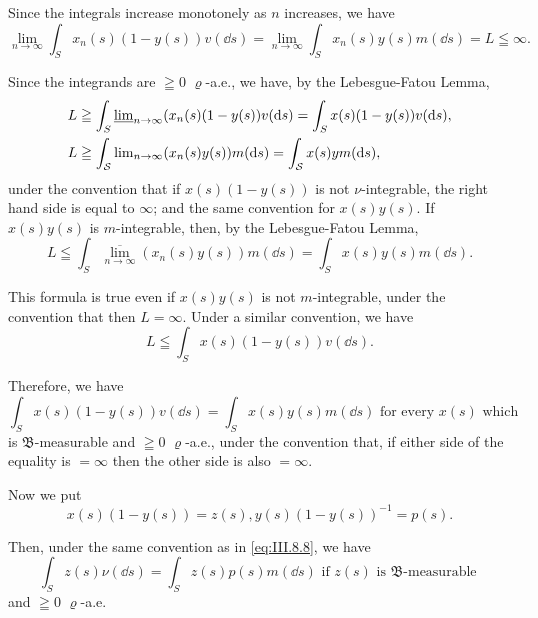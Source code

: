 Since the integrals increase monotonely as $n$ increases, we have 
\begin{equation}\label{eq:III.8.4}
\lim\limits _{n \rightarrow \infty} \int_{S} x _{n} (s) (1 - y (s)) v (\dd s) = \lim\limits _{n \rightarrow \infty} \int_{S} x _{n} (s) y (s) m (\dd s) = L \leqq \infty .
\end{equation}

Since the integrands are $\geqq 0$ $\varrho$-a.e., we have, by the Lebesgue-Fatou Lemma, 
\begin{align}
L& \geqq \int_{S} \varliminf\nolimits_{n \rightarrow \infty} (x _{n} (s) (1 - y (s)) v (\mathop{}\!\mathrm{d} s) = \int_{S} x (s) (1 - y (s)) v (\mathop{}\!\mathrm{d} s), \label{eq:III.8.5} \\
L& \geqq \int_ {\mathcal {S}} \lim\nolimits _{n \rightarrow \infty} (x _{n} (s) y (s)) m (\mathop{}\!\mathrm{d} s) = \int_ {\mathcal {S}} x (s) y m (\mathop{}\!\mathrm{d} s), \notag
\end{align}
under the convention that if $x(s) (1 - y(s))$ is not $\nu$-integrable, the right hand side is equal to $\infty$; and the same convention for $x(s) y(s)$. If $x(s) y(s)$ is $m$-integrable, then, by the Lebesgue-Fatou Lemma, 
\begin{equation}\label{eq:III.8.6}
L \leqq \int_{S} \overline {{\lim\limits _{n \rightarrow \infty}}} (x _{n} (s) y (s)) m (\dd s) = \int_{S} x (s) y (s) m (\dd s).
\end{equation}

This formula is true even if $x(s)y(s)$ is not $m$-integrable, under the convention that then $L=\infty$. Under a similar convention, we have 
\begin{equation}\label{eq:III.8.7}
L \leqq \int_{S} x (s) (1 - y (s)) v (\dd s).
\end{equation}

Therefore, we have 
\begin{equation}\label{eq:III.8.8}
\int_{S} x (s) (1 - y (s)) v (\dd s) = \int_{S} x (s) y (s) m (\dd s) \text{ for every } x (s) \text{ which }
\end{equation}
is $\mathfrak{B}$-measurable and $\geqq 0$ $\varrho$-a.e., 
under the convention that, if either side of the equality is $=\infty$ then the other side is also $=\infty$. 

Now we put 
\[
x (s) (1 - y (s)) = z (s), y (s) (1 - y (s)) ^{-1} = p (s).
\]

Then, under the same convention as in \eqref{eq:III.8.8}, we have 
\begin{equation}\label{eq:III.8.9}
\int_{S} z (s) \nu (\dd s) = \int_{S} z (s) p (s) m (\dd s) \text{ if } z (s) \text{ is } \mathfrak {B} \text{-measurable }
\end{equation}
and $\geqq 0$ $\varrho$-a.e. 

